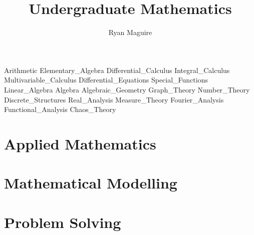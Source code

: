 \documentclass[crop=false,class=book,oneside]{standalone}
\begin{document}
    \newif\ifmathcourses
    \ifx\ifcourses\undefined
        \title{Undergraduate Mathematics}
        \author{Ryan Maguire}
        \date{\vspace{-5ex}}
        \maketitle
        \tableofcontents
        \listoffigures
        \listoftables
        \clearpage
    \fi
    {Arithmetic}
    {Elementary_Algebra}
    {Differential_Calculus}
    {Integral_Calculus}
    {Multivariable_Calculus}
    {Differential_Equations}
    {Special_Functions}
    {Linear_Algebra}
    {Algebra}
    {Algebraic_Geometry}
    {Graph_Theory}
    {Number_Theory}
    {Discrete_Structures}
    {Real_Analysis}
    {Measure_Theory}
    {Fourier_Analysis}
    {Functional_Analysis}
    {Chaos_Theory}
    \chapter{Applied Mathematics}
    \chapter{Mathematical Modelling}
    \chapter{Problem Solving}
\end{document}

